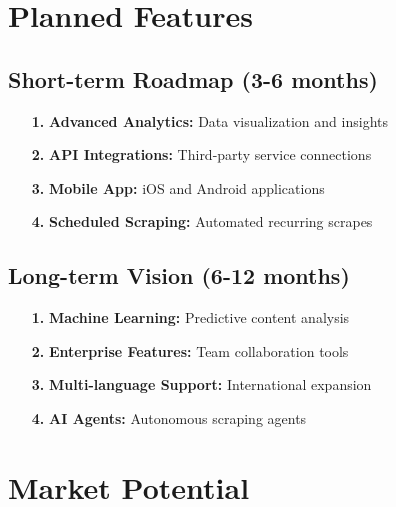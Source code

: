 \documentclass[12pt,a4paper]{report}
\begin{document}
\section{Planned Features}

\subsection{Short-term Roadmap (3-6 months)}

\begin{enumerate}[leftmargin=2cm]
    \item[\textcolor{accentorange}{\textbf{1.}}] \textbf{Advanced Analytics:} Data visualization and insights
    \item[\textcolor{accentorange}{\textbf{2.}}] \textbf{API Integrations:} Third-party service connections
    \item[\textcolor{accentorange}{\textbf{3.}}] \textbf{Mobile App:} iOS and Android applications
    \item[\textcolor{accentorange}{\textbf{4.}}] \textbf{Scheduled Scraping:} Automated recurring scrapes
\end{enumerate}

\subsection{Long-term Vision (6-12 months)}

\begin{enumerate}[leftmargin=2cm]
    \item[\textcolor{warningred}{\textbf{1.}}] \textbf{Machine Learning:} Predictive content analysis
    \item[\textcolor{warningred}{\textbf{2.}}] \textbf{Enterprise Features:} Team collaboration tools
    \item[\textcolor{warningred}{\textbf{3.}}] \textbf{Multi-language Support:} International expansion
    \item[\textcolor{warningred}{\textbf{4.}}] \textbf{AI Agents:} Autonomous scraping agents
\end{enumerate}

\section{Market Potential}
\end{document}
